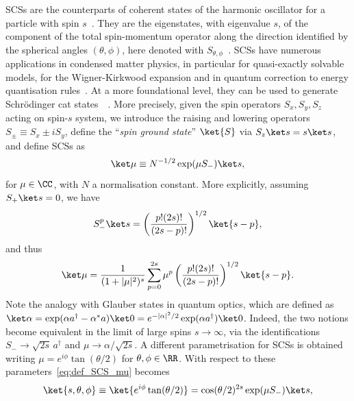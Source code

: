 \acfp{SCS} are the counterparts of coherent states of the harmonic oscillator for a particle with spin $s$~\cite{radcliffe1971some,arecchi1972atomic,agarwal1997atomic,markham2003classicality,chryssomalakos2018geometry}. They are the eigenstates, with eigenvalue $s$, of the component of the total spin-momentum operator along the direction identified by the spherical angles $(\theta, \phi)$, here denoted with $S_{\theta,\phi}$~\cite{arecchi1972atomic,agarwal1997atomic,ulyanov1999spin,lee2015visualizing}.
\acp{SCS} have numerous applications in condensed matter physics, in particular for quasi-exactly solvable models, for the Wigner-Kirkwood expansion and in quantum correction to energy quantisation rules~\cite{ulyanov1999spin}. At a more foundational level, they can be used to generate Schrödinger cat states~~\cite{agarwal1997atomic}.
More precisely, given the spin operators $S_x,S_y,S_z$ acting on spin-$s$ system, we introduce the raising and lowering operators $S_\pm\equiv S_x\pm i S_y$, define the ``\emph{spin ground state}'' $\ket{S}$ via $S_z\ket s=s\ket s$, and define SCSs as
\begin{equation}
    \ket\mu \equiv N^{-1/2} \exp(\mu S_-) \ket s,
\end{equation}
for $\mu\in\CC$, with $N$ a normalisation constant.
More explicitly, assuming $S_+\ket s=0$, we have
\begin{equation}
    S_-^p \ket s = \left(\frac{p! (2s)!}{(2s-p)!}\right)^{1/2} \ket{s-p},
\end{equation}
and thus
\begin{equation}
    \ket\mu = \frac{1}{(1+\lvert\mu\rvert^2)^s}
    \sum_{p=0}^{2s} \mu^p\left(\frac{p! (2s)!}{(2s-p)!}\right)^{1/2} \ket{s-p}.
    \label{eq:def_SCS_mu}
\end{equation}
Note the analogy with Glauber states in quantum optics, which are defined as
$\ket\alpha=\exp(\alpha a^\dagger-\alpha^* a)\ket0
= e^{-\lvert\alpha\rvert^2/2}\exp(\alpha a^\dagger)\ket 0$.
Indeed, the two notions become equivalent in the limit of large spins $s\to\infty$, via the identifications
$S_-\to \sqrt{2s} \,a^\dagger$
and
$\mu\to \alpha/\sqrt{2s}$.
A different parametrisation for SCSs is obtained writing $\mu=e^{i\phi}\tan(\theta/2)$ for $\theta,\phi\in\RR$.
With respect to these parameters~\cref{eq:def_SCS_mu} becomes
\begin{equation}
    \ket{s,\theta,\phi} \equiv \ket{e^{i\phi}\tan(\theta/2)} =
    \cos(\theta/2)^{2s} \exp(\mu S_-)\ket s,
\end{equation}
